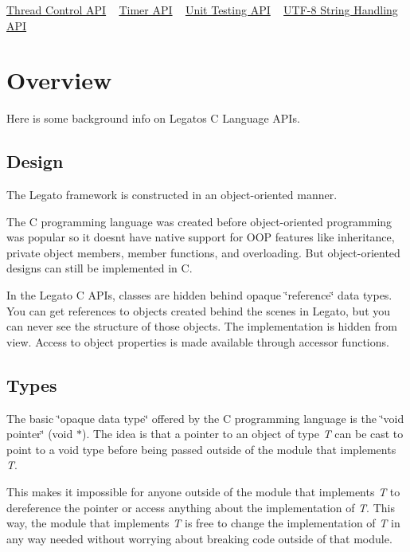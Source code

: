  \hyperlink{c_threading}{Thread Control A\+P\+I} ~\newline
 \hyperlink{c_timer}{Timer A\+P\+I} ~\newline
 \hyperlink{c_test}{Unit Testing A\+P\+I} ~\newline
 \hyperlink{c_utf8}{U\+T\+F-\/8 String Handling A\+P\+I} ~\newline
\hypertarget{c__a_p_is_cApiOverview}{}\section{Overview}\label{c__a_p_is_cApiOverview}
Here is some background info on Legato\textquotesingle{}s C Language A\+P\+Is.\hypertarget{c__a_p_is_Object-Oriented}{}\subsection{Design}\label{c__a_p_is_Object-Oriented}
The Legato framework is constructed in an object-\/oriented manner.

The C programming language was created before object-\/oriented programming was popular so it doesn\textquotesingle{}t have native support for O\+O\+P features like inheritance, private object members, member functions, and overloading. But object-\/oriented designs can still be implemented in C.

In the Legato C A\+P\+Is, classes are hidden behind opaque \char`\"{}reference\char`\"{} data types. You can get references to objects created behind the scenes in Legato, but you can never see the structure of those objects. The implementation is hidden from view. Access to object properties is made available through accessor functions.\hypertarget{c__a_p_is_Opaque}{}\subsection{Types}\label{c__a_p_is_Opaque}
The basic \char`\"{}opaque data type\char`\"{} offered by the C programming language is the \char`\"{}void pointer\char`\"{} (void $\ast$). The idea is that a pointer to an object of type {\itshape T} can be cast to point to a void type before being passed outside of the module that implements {\itshape T}.

This makes it impossible for anyone outside of the module that implements {\itshape T} to dereference the pointer or access anything about the implementation of {\itshape T}. This way, the module that implements {\itshape T} is free to change the implementation of {\itshape T} in any way needed without worrying about breaking code outside of that module.


